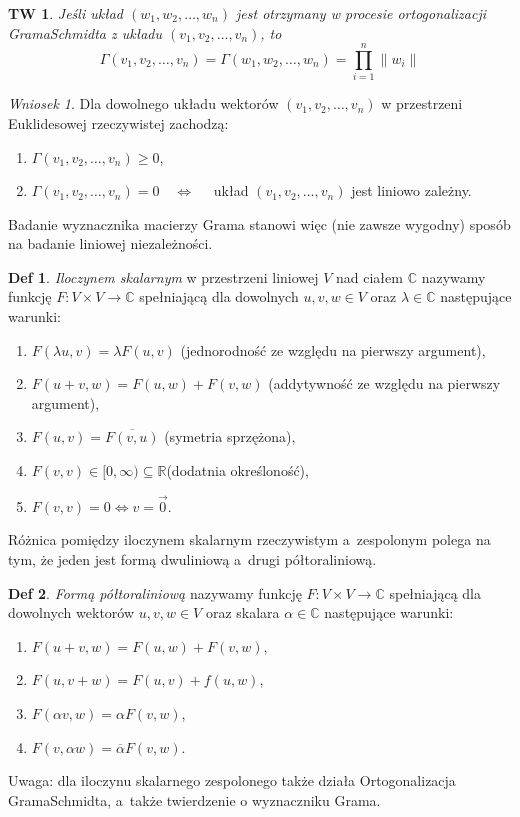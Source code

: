 \documentclass[a4paper, 12pt]{mwart}
\theoremstyle{definition}
\newtheorem{definicja}{Def}[section]
\theoremstyle{plain}
\newtheorem{twierdzenie}{TW}[section]
\theoremstyle{remark}
\newtheorem{wniosek}{Wniosek}[section]
\begin{document}
\begin{twierdzenie}
	Jeśli układ $(w_1, w_2, \ldots, w_n)$ jest otrzymany w procesie ortogonalizacji Grama\ppauza Schmidta z układu $(v_1, v_2, \ldots, v_n)$, to
	\begin{equation}
		\Gamma(v_1, v_2, \ldots, v_n) = \Gamma(w_1, w_2, \ldots, w_n) = \prod_{i = 1}^n \|w_i\|
	\end{equation}
\end{twierdzenie}
\begin{wniosek}
	Dla dowolnego układu wektorów $(v_1, v_2, \ldots, v_n)$ w przestrzeni Euklidesowej rzeczywistej zachodzą:
	\begin{enumerate}
		\item $\Gamma(v_1, v_2, \ldots, v_n) \geq 0$,
		\item $\Gamma(v_1, v_2, \ldots, v_n) = 0 \quad \iff \quad$ układ $(v_1, v_2, \ldots, v_n)$ jest liniowo zależny.
	\end{enumerate}
	Badanie wyznacznika macierzy Grama stanowi więc (nie zawsze wygodny) sposób na badanie liniowej niezależności.
\end{wniosek}
\begin{definicja}
	\emph{Iloczynem skalarnym} w przestrzeni liniowej $V$ nad ciałem $\mathbb{C}$ nazywamy funkcję $F\colon V\times V \to \mathbb{C}$ spełniającą dla dowolnych $u, v, w \in V$ oraz $\lambda \in \mathbb{C}$ następujące warunki:
	\begin{enumerate}
		\item $F(\lambda u, v) = \lambda F(u, v)$ \quad (jednorodność ze względu na pierwszy argument),
		\item $F(u + v, w) = F(u, w) + F(v, w)$ \quad (addytywność ze względu na pierwszy argument),
		\item $F(u, v) = \overline{F(v, u)}$ \quad (symetria sprzężona),
		\item $F(v, v) \in [0, \infty)\subseteq\mathbb{R} $\quad (dodatnia określoność),
		\item $F(v, v) = 0 \iff v = \vec 0$.
		\end{enumerate}
\end{definicja}
Różnica pomiędzy iloczynem skalarnym rzeczywistym a~zespolonym polega na tym, że jeden jest formą dwuliniową a~drugi \ppauza półtoraliniową.
\begin{definicja}
	\emph{Formą półtoraliniową} nazywamy funkcję $F\colon V\times V\to \mathbb{C}$ spełniającą dla dowolnych wektorów $u, v, w\in V$ oraz skalara $\alpha\in\mathbb{C}$ następujące warunki:
	\begin{enumerate}
		\item $F(u+v, w) = F(u, w) + F(v, w)$,
		\item $F(u, v+w) = F(u, v) + f(u, w)$,
		\item $F(\alpha v, w) = \alpha F(v, w)$,
		\item $F(v, \alpha w) = \overline\alpha F(v, w)$.
	\end{enumerate}
\end{definicja}
Uwaga: dla iloczynu skalarnego zespolonego także działa Ortogonalizacja Grama\ppauza Schmidta, a~także twierdzenie o wyznaczniku Grama.
\end{document}
